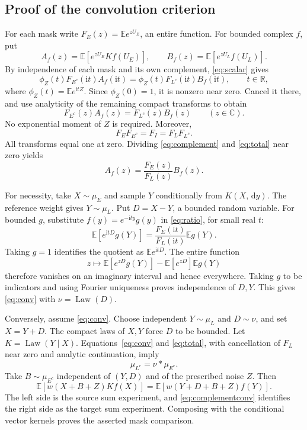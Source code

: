\documentclass[11pt,a4paper]{article}
\theoremstyle{remark}\newtheorem*{ednote}{Editorial note (ProveIt, 2026-10-01)}
\newcommand{\E}{\mathbb E}\newcommand{\R}{\mathbb R}\newcommand{\C}{\mathbb C}\newcommand{\N}{\mathbb N}
\newcommand{\Law}{\operatorname{Law}}\newcommand{\ind}{\mathbf1}
\newcommand{\dd}{\,\mathrm d}\newcommand{\ii}{\mathrm i}
\begin{document}
\subsection{Proof of the convolution criterion}
For each mask write $F_E(z)=\E e^{zU_E}$, an entire function. For bounded complex $f$, put
\[
 A_f(z)=\E[e^{zU_E}Kf(U_E)],\qquad
 B_f(z)=\E[e^{zU_L}f(U_L)].
\]
By independence of each mask and its own complement, \eqref{eq:scalar} gives
\[
 \phi_Z(t)F_{E^c}(\ii t)A_f(\ii t)
 =\phi_Z(t)F_{L^c}(\ii t)B_f(\ii t),\qquad t\in\R,
\]
where $\phi_Z(t)=\E e^{\ii tZ}$. Since $\phi_Z(0)=1$, it is nonzero near zero. Cancel it there, and use analyticity of the remaining compact transforms to obtain
\begin{equation}\label{eq:complement}
 F_{E^c}(z)A_f(z)=F_{L^c}(z)B_f(z)\qquad(z\in\C).
\end{equation}
No exponential moment of $Z$ is required. Moreover,
\begin{equation}\label{eq:total}
 F_EF_{E^c}=F_I=F_LF_{L^c}.
\end{equation}
All transforms equal one at zero. Dividing \eqref{eq:complement} and \eqref{eq:total} near zero yields
\begin{equation}\label{eq:ratio}
 A_f(z)=\frac{F_E(z)}{F_L(z)}B_f(z).
\end{equation}

For necessity, take $X\sim\mu_E$ and sample $Y$ conditionally from $K(X,\dd y)$. The reference weight gives $Y\sim\mu_L$. Put $D=X-Y$, a bounded random variable. For bounded $g$, substitute $f(y)=e^{-\ii ty}g(y)$ in \eqref{eq:ratio}, for small real $t$:
\[
 \E[e^{\ii tD}g(Y)]
 =\frac{F_E(\ii t)}{F_L(\ii t)}\E g(Y).
\]
Taking $g=1$ identifies the quotient as $\E e^{\ii tD}$. The entire function
\[
 z\longmapsto\E[e^{zD}g(Y)]-\E[e^{zD}]\E g(Y)
\]
therefore vanishes on an imaginary interval and hence everywhere. Taking $g$ to be indicators and using Fourier uniqueness proves independence of $D,Y$. This gives \eqref{eq:conv} with $\nu=\Law(D)$.

Conversely, assume \eqref{eq:conv}. Choose independent $Y\sim\mu_L$ and $D\sim\nu$, and set $X=Y+D$. The compact laws of $X,Y$ force $D$ to be bounded. Let $K=\Law(Y\mid X)$. Equations~\eqref{eq:conv} and \eqref{eq:total}, with cancellation of $F_L$ near zero and analytic continuation, imply
\begin{equation}\label{eq:complementconv}
 \mu_{L^c}=\nu*\mu_{E^c}.
\end{equation}
Take $B\sim\mu_{E^c}$ independent of $(Y,D)$ and of the prescribed noise $Z$. Then
\begin{equation}\label{eq:reverse}
 \E[w(X+B+Z)Kf(X)]=\E[w(Y+D+B+Z)f(Y)].
\end{equation}
The left side is the source sum experiment, and \eqref{eq:complementconv} identifies the right side as the target sum experiment. Composing with the conditional vector kernels proves the asserted mask comparison.
\end{document}
